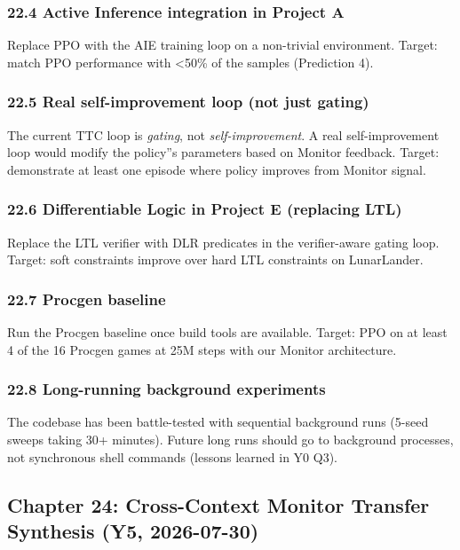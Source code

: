 \documentclass[11pt]{article}
\begin{document}
\subsubsection{22.4 Active Inference integration in Project A}

Replace PPO with the AIE training loop on a non-trivial environment. Target:
match PPO performance with <50\% of the samples (Prediction 4).

\subsubsection{22.5 Real self-improvement loop (not just gating)}

The current TTC loop is \textit{gating}, not \textit{self-improvement}. A real self-improvement
loop would modify the policy''s parameters based on Monitor feedback. Target:
demonstrate at least one episode where policy improves from Monitor signal.

\subsubsection{22.6 Differentiable Logic in Project E (replacing LTL)}

Replace the LTL verifier with DLR predicates in the verifier-aware gating loop.
Target: soft constraints improve over hard LTL constraints on LunarLander.

\subsubsection{22.7 Procgen baseline}

Run the Procgen baseline once build tools are available. Target: PPO on at
least 4 of the 16 Procgen games at 25M steps with our Monitor architecture.

\subsubsection{22.8 Long-running background experiments}

The codebase has been battle-tested with sequential background runs (5-seed
sweeps taking 30+ minutes). Future long runs should go to background processes,
not synchronous shell commands (lessons learned in Y0 Q3).

\hrulefill

\subsection{Chapter 24: Cross-Context Monitor Transfer Synthesis (Y5, 2026-07-30)}
\end{document}
